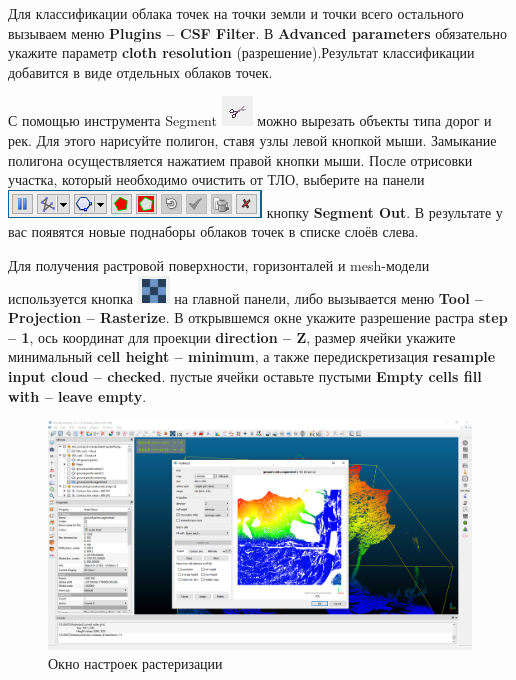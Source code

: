 \documentclass[
  12pt,
]{book}
\begin{document}
Для классификации облака точек на точки земли и точки всего остального вызываем меню \textbf{Plugins -- CSF Filter}. В \textbf{Advanced parameters} обязательно укажите параметр \textbf{cloth resolution} (разрешение).Результат классификации добавится в виде отдельных облаков точек.

С помощью инструмента Segment \includegraphics{images/Ref19/Segment.png} можно вырезать объекты типа дорог и рек. Для этого нарисуйте полигон, ставя узлы левой кнопкой мыши. Замыкание полигона осуществляется нажатием правой кнопки мыши. После отрисовки участка, который необходимо очистить от ТЛО, выберите на панели \includegraphics{images/Ref19/Segment_panel.png} кнопку \textbf{Segment Out}. В результате у вас появятся новые поднаборы облаков точек в списке слоёв слева.

Для получения растровой поверхности, горизонталей и mesh-модели используется кнопка \includegraphics{images/Ref19/Rasterize.png} на главной панели, либо вызывается меню \textbf{Tool -- Projection -- Rasterize}. В открывшемся окне укажите разрешение растра \textbf{step -- 1}, ось координат для проекции \textbf{direction -- Z}, размер ячейки укажите минимальный \textbf{cell height -- minimum}, а также передискретизация \textbf{resample input cloud -- checked}. пустые ячейки оставьте пустыми \textbf{Empty cells fill with -- leave empty}.

\begin{figure}
\centering
\includegraphics{images/Ref19/Rasterize_window.png}
\caption{Окно настроек растеризации}
\end{figure}
\end{document}
